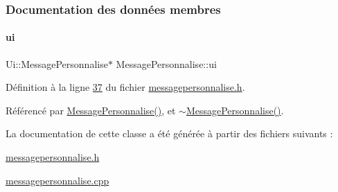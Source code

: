 \subsubsection{Documentation des données membres}
\mbox{\label{class_message_personnalise_a94bdf252f3e858ec1c2ed354d31a91e3}} 
\paragraph{\texorpdfstring{ui}{ui}}
{\footnotesize\ttfamily Ui\+::\+Message\+Personnalise$\ast$ Message\+Personnalise\+::ui\hspace{0.3cm}{\ttfamily [private]}}



Définition à la ligne \hyperlink{messagepersonnalise_8h_source_l00037}{37} du fichier \hyperlink{messagepersonnalise_8h_source}{messagepersonnalise.\+h}.



Référencé par \hyperlink{messagepersonnalise_8cpp_source_l00004}{Message\+Personnalise()}, et \hyperlink{messagepersonnalise_8cpp_source_l00012}{$\sim$\+Message\+Personnalise()}.



La documentation de cette classe a été générée à partir des fichiers suivants \+:\begin{DoxyCompactItemize}
\item 
\hyperlink{messagepersonnalise_8h}{messagepersonnalise.\+h}\item 
\hyperlink{messagepersonnalise_8cpp}{messagepersonnalise.\+cpp}\end{DoxyCompactItemize}
